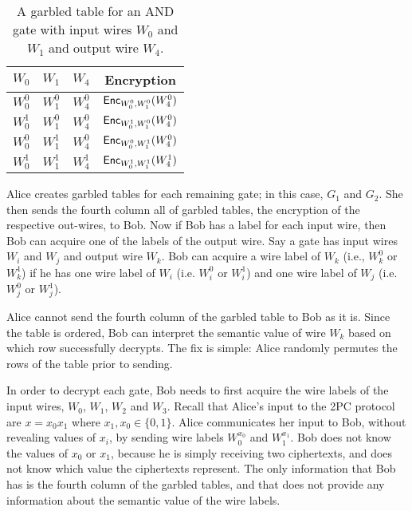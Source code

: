 \begin{table}[h]
\centering
\begin{tabular}{|c|c|c|c|}
\hline
$W_0$ & $W_1$ & $W_4$ & Encryption \\
\hline
$W_0^0$ & $W_1^0$ & $W_4^0$ & $\textsf{Enc}_{W_0^0, W_1^0}(W_4^0)$ \\
$W_0^1$ & $W_1^0$ & $W_4^0$ & $\textsf{Enc}_{W_0^1, W_1^0}(W_4^0)$ \\
$W_0^0$ & $W_1^1$ & $W_4^0$ & $\textsf{Enc}_{W_0^0, W_1^1}(W_4^0)$ \\
$W_0^1$ & $W_1^1$ & $W_4^1$ & $\textsf{Enc}_{W_0^1, W_1^1}(W_4^1)$ \\
\hline
\end{tabular}
\caption{A garbled table for an AND gate with input wires $W_0$ and $W_1$ and output wire $W_4$.}
\label{tbl:g0-table}
\end{table}

Alice creates garbled tables for each remaining gate; in this case, $G_1$ and $G_2$.
She then sends the fourth column all of garbled tables, the encryption of the respective out-wires, to Bob.
Now if Bob has a label for each input wire, then Bob can acquire one of the labels of the output wire.
Say a gate has input wires $W_i$ and $W_j$ and output wire $W_k$.
Bob can acquire a wire label of $W_k$ (i.e., $W_k^0$ or $W_k^1$) if he has one wire label of $W_i$ (i.e. $W_i^0$ or $W_i^1$) and one wire label of $W_j$ (i.e. $W_j^0$ or $W_j^1$).

Alice cannot send the fourth column of the garbled table to Bob as it is. 
Since the table is ordered, Bob can interpret the semantic value of wire $W_k$ based on which row successfully decrypts. 
The fix is simple: Alice randomly permutes the rows of the table prior to sending.

In order to decrypt each gate, Bob needs to first acquire the wire labels of the input wires, $W_0$, $W_1$, $W_2$ and $W_3$.
Recall that Alice's input to the 2PC protocol are $x = x_0x_1$ where $x_1, x_0 \in \{0,1\}$.
Alice communicates her input to Bob, without revealing values of $x_i$, by sending wire labels $W_0^{x_0}$ and $W_1^{x_1}$.
Bob does not know the values of $x_0$ or $x_1$, because he is simply receiving two ciphertexts, and does not know which value the ciphertexts represent.
The only information that Bob has is the fourth column of the garbled tables, and that does not provide any information about the semantic value of the wire labels.

